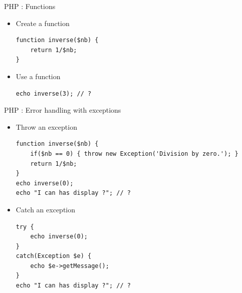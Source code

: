 \documentclass{beamer}
\begin{document}
\begin{frame}[fragile]{PHP : Functions}
    \begin{itemize}
        \item Create a function
        \begin{lstlisting}
function inverse($nb) {
    return 1/$nb;
}
        \end{lstlisting}
        \item Use a function
        \begin{lstlisting}
echo inverse(3); // ?
        \end{lstlisting}
    \end{itemize}
\end{frame}

\begin{frame}[fragile]{PHP : Error handling with exceptions}
    \begin{itemize}
        \item Throw an exception
        \begin{lstlisting}
function inverse($nb) {
    if($nb == 0) { throw new Exception('Division by zero.'); }
    return 1/$nb;
}
echo inverse(0);
echo "I can has display ?"; // ?
        \end{lstlisting}
        \pause
        \item Catch an exception
        \begin{lstlisting}
try {
    echo inverse(0);
}
catch(Exception $e) {
    echo $e->getMessage();
}
echo "I can has display ?"; // ?
        \end{lstlisting}
    \end{itemize}
\end{frame}
\end{document}
